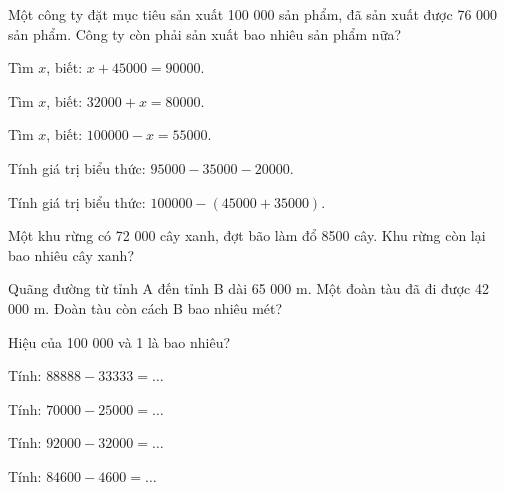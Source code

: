 \begin{ex}
Một công ty đặt mục tiêu sản xuất 100 000 sản phẩm, đã sản xuất được 76 000 sản phẩm. Công ty còn phải sản xuất bao nhiêu sản phẩm nữa?
\end{ex}

\begin{ex}
Tìm $x$, biết: $x + 45000 = 90000$.
\end{ex}

\begin{ex}
Tìm $x$, biết: $32000 + x = 80000$.
\end{ex}

\begin{ex}
Tìm $x$, biết: $100000 - x = 55000$.
\end{ex}

\begin{ex}
Tính giá trị biểu thức: $95000 - 35000 - 20000$.
\end{ex}

\begin{ex}
Tính giá trị biểu thức: $100000 - (45000 + 35000)$.
\end{ex}

\begin{ex}
Một khu rừng có 72 000 cây xanh, đợt bão làm đổ 8500 cây. Khu rừng còn lại bao nhiêu cây xanh?
\end{ex}

\begin{ex}
Quãng đường từ tỉnh A đến tỉnh B dài 65 000 m. Một đoàn tàu đã đi được 42 000 m. Đoàn tàu còn cách B bao nhiêu mét?
\end{ex}

\begin{ex}
Hiệu của 100 000 và 1 là bao nhiêu?
\end{ex}

\begin{ex}
Tính: $88888 - 33333 = \dots$
\end{ex}

\begin{ex}
Tính: $70000 - 25000 = \dots$
\end{ex}

\begin{ex}
Tính: $92000 - 32000 = \dots$
\end{ex}

\begin{ex}
Tính: $84600 - 4600 = \dots$
\end{ex}
